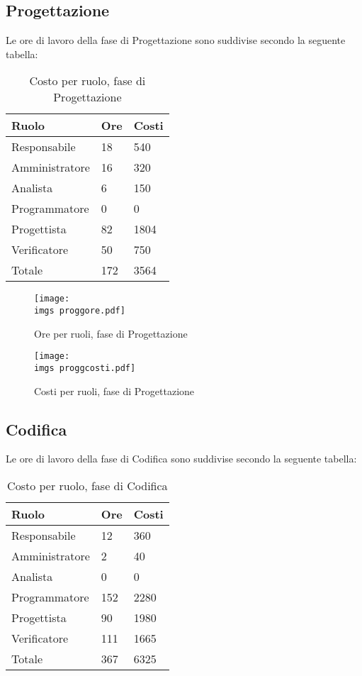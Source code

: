 {\subsection{Progettazione}{
	Le ore di lavoro della fase di Progettazione sono suddivise secondo la seguente tabella:
	\begin{table}[H]
	 	\centering
	  \begin{tabular}{p{}p{}
	  		  				p{}}
		  \toprule Ruolo & Ore  & Costi \\
		  \midrule
		  Responsabile & 18  & 540 \\
		  Amministratore & 16  & 320 \\
		  Analista & 6   & 150 \\
		  Programmatore & 0   & 0 \\
		  Progettista & 82  & 1804 \\
		  Verificatore & 50  & 750 \\
		  Totale & 172  & 3564 \\
		  \bottomrule
	  \end{tabular}
	 	\label{tab:costoprogettazione}
		\caption{Costo per ruolo, fase di Progettazione}
	\end{table}
	
	\begin{figure}[H]
		\centering
		\texttt{[image: \\imgs proggore.pdf]}
		\label{fig:oreprogettazione}
		\caption{Ore per ruoli, fase di Progettazione}
	\end{figure}
	\begin{figure}[H]
		\centering
		\texttt{[image: \\imgs proggcosti.pdf]}
		\label{fig:costoprogettazione}
		\caption{Costi per ruoli, fase di Progettazione}
	\end{figure}
}
\subsection{Codifica}{
	Le ore di lavoro della fase di Codifica sono suddivise secondo la seguente tabella:
	\begin{table}[H]
		 \centering
		\begin{tabular}{p{}p{}
			  		  				p{}}
			  \toprule Ruolo & Ore  & Costi \\
			  \midrule
			  Responsabile & 12  & 360 \\
			  Amministratore & 2   & 40 \\
			  Analista & 0   & 0 \\
			  Programmatore & 152  & 2280 \\
			  Progettista & 90  & 1980 \\
			  Verificatore & 111  & 1665 \\
			  Totale & 367  & 6325 \\
			  \bottomrule
		  \end{tabular}
		 \label{tab:costocodifica}
		 \caption{Costo per ruolo, fase di Codifica}
	\end{table}
	
}}
